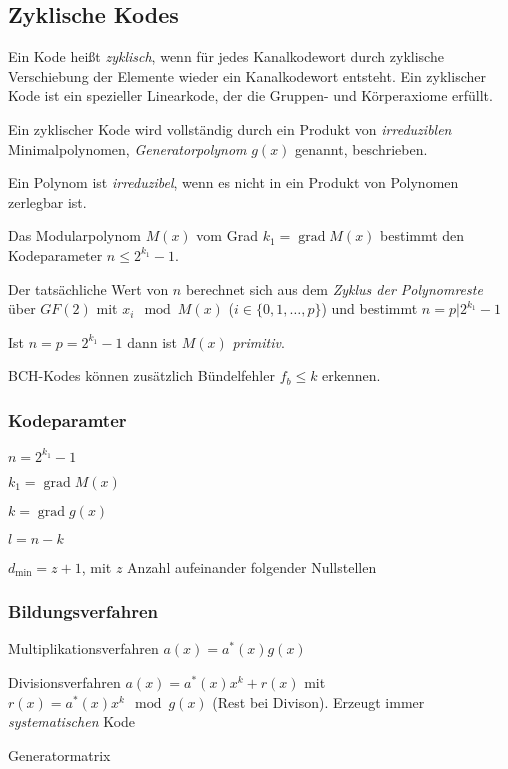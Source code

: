 \documentclass[8pt,a4paper,landscape]{extarticle}
\DeclareMathOperator*{\grad}{grad}
\begin{document}
\begin{multicols*}{6}
\subsection{Zyklische Kodes}
\begin{compactitem}
	\item Ein Kode heißt \emph{zyklisch}, wenn für jedes Kanalkodewort durch zyklische Verschiebung der Elemente wieder ein Kanalkodewort entsteht. Ein zyklischer Kode ist ein spezieller Linearkode, der die Gruppen- und Körperaxiome erfüllt.
	\item Ein zyklischer Kode wird vollständig durch ein Produkt von \emph{irreduziblen} Minimalpolynomen, \emph{Generatorpolynom} $g(x)$ genannt, beschrieben.
	\item Ein Polynom ist \emph{irreduzibel}, wenn es nicht in ein Produkt von Polynomen zerlegbar ist.
	\item Das Modularpolynom $M(x)$ vom Grad $k_1 = \grad M(x)$ bestimmt den Kodeparameter $n \le 2^{k_1} - 1$.
	\item Der tatsächliche Wert von $n$ berechnet sich aus dem \emph{Zyklus der Polynomreste} über $GF(2)$ mit $x_i \mod M(x)$ ($i \in \lbrace 0, 1, \dots{}, p\rbrace$) und bestimmt $n = p | 2^{k_1} - 1$
	\item Ist $n = p = 2^{k_1} - 1$ dann ist $M(x)$ \emph{primitiv}.
	\item BCH-Kodes können zusätzlich Bündelfehler $f_b \le k$ erkennen.
\end{compactitem}

\subsubsection{Kodeparamter}
$n = 2^{k_1} - 1$

$k_1 = \grad M(x)$

$k = \grad g(x)$

$l = n - k$

$d_\text{min} = z + 1$, mit $z$ Anzahl aufeinander folgender Nullstellen 

\subsubsection{Bildungsverfahren}
\begin{compactdesc}
	\item[Multiplikationsverfahren] $a(x) = a^{*}(x) g(x)$
	\item[Divisionsverfahren] $a(x) = a^{*}(x) x^k + r(x)$ mit $r(x) = a^{*}(x) x^k \mod g(x)$ (Rest bei Divison). Erzeugt immer \emph{systematischen} Kode
	\item[Generatormatrix] 
\end{compactdesc}


\end{multicols*}
\end{document}
